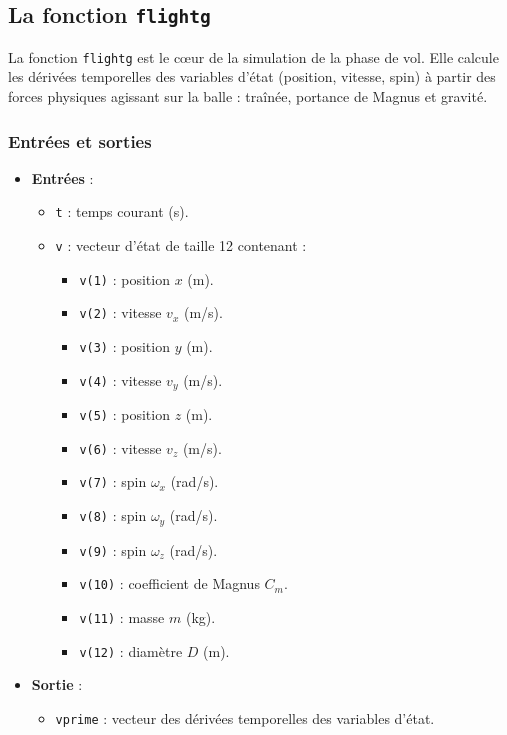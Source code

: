 \documentclass[10pt,a4paper]{report}
\begin{document}
\bigskip
\subsection{La fonction \texttt{flightg}}
\label{subsec:flightg}

La fonction \texttt{flightg} est le cœur de la simulation de la phase de vol. Elle calcule les dérivées temporelles des variables d'état (position, vitesse, spin) à partir des forces physiques agissant sur la balle : traînée, portance de Magnus et gravité.

\subsubsection{Entrées et sorties}
\begin{itemize}
    \item \textbf{Entrées} :
    \begin{itemize}
        \item \texttt{t} : temps courant (s).
        \item \texttt{v} : vecteur d'état de taille 12 contenant :
        \begin{itemize}
            \item \texttt{v(1)} : position \(x\) (m).
            \item \texttt{v(2)} : vitesse \(v_x\) (m/s).
            \item \texttt{v(3)} : position \(y\) (m).
            \item \texttt{v(4)} : vitesse \(v_y\) (m/s).
            \item \texttt{v(5)} : position \(z\) (m).
            \item \texttt{v(6)} : vitesse \(v_z\) (m/s).
            \item \texttt{v(7)} : spin \(\omega_x\) (rad/s).
            \item \texttt{v(8)} : spin \(\omega_y\) (rad/s).
            \item \texttt{v(9)} : spin \(\omega_z\) (rad/s).
            \item \texttt{v(10)} : coefficient de Magnus \(C_m\).
            \item \texttt{v(11)} : masse \(m\) (kg).
            \item \texttt{v(12)} : diamètre \(D\) (m).
        \end{itemize}
    \end{itemize}
    \item \textbf{Sortie} :
    \begin{itemize}
        \item \texttt{vprime} : vecteur des dérivées temporelles des variables d'état.
    \end{itemize}
\end{itemize}
\end{document}
